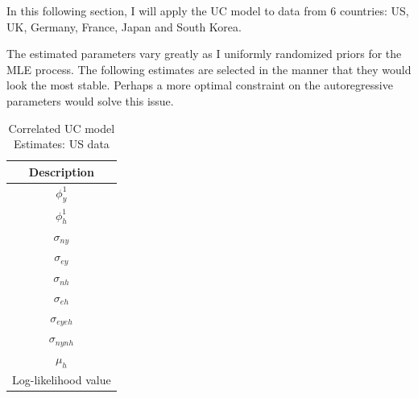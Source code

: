 \documentclass[fleqn]{article}
\begin{document}
\begin{outline}[enumerate]
In this following section, I will apply the UC model to data from 6 countries: US, UK, Germany, France, Japan and South Korea.

The estimated parameters vary greatly as I uniformly randomized priors for the MLE process. The following estimates are selected in the manner that they would look the most stable. Perhaps a more optimal constraint on the autoregressive parameters would solve this issue.

\pagebreak


\begin{table}
	\begin{center}
	\caption{Correlated UC model Estimates: US data}
	\begin{tabular}{c}
		\toprule
		Description\\
		\midrule
		$\phi^1_{y}$ \\
		$\phi^1_{h}$ \\
		$\sigma_{ny}$\\
		$\sigma_{ey}$\\
		$\sigma_{nh}$\\
		$\sigma_{eh}$\\
		$\sigma_{eyeh}$\\
		$\sigma_{nynh}$\\
		$\mu_h$\\
		Log-likelihood value\\
		\bottomrule
	\end{tabular}%
	\end{center}
\end{table}


\end{outline}
\end{document}
